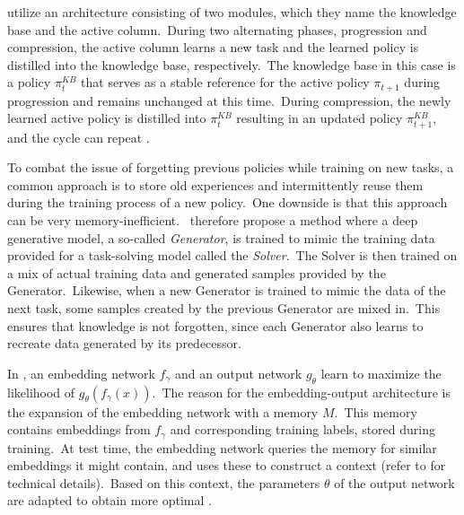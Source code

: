 \textcite{Schwarz2018} utilize an architecture consisting of two modules, which they name the knowledge base and the active column.\ During two alternating phases, progression and compression, the active column learns a new task and the learned policy is distilled into the knowledge base, respectively.\ The knowledge base in this case is a policy $\pi_{t}^{KB}$ that serves as a stable reference for the active policy $\pi_{t+1}$ during progression and remains unchanged at this time.\ During compression, the newly learned active policy is distilled into $\pi_{t}^{KB}$ resulting in an updated policy $\pi_{t+1}^{KB}$, and the cycle can repeat .

To combat the issue of forgetting previous policies while training on new tasks, a common approach is to store old experiences and intermittently reuse them during the training process of a new policy.\ One downside is that this approach can be very memory-inefficient.\ \textcite{Shin2017} therefore propose a method where a deep generative model, a so-called \emph{Generator}, is trained to mimic the training data provided for a task-solving model called the \emph{Solver}.\ The Solver is then trained on a mix of actual training data and generated samples provided by the Generator.\ Likewise, when a new Generator is trained to mimic the data of the next task, some samples created by the previous Generator are mixed in.\ This ensures that knowledge is not forgotten, since each Generator also learns to recreate data generated by its predecessor.

In \textcite{Sprechmann2018}, an embedding network $f_{\gamma}$ and an output network $g_{\theta}$ learn to maximize the likelihood of $g_{\theta}(f_{\gamma}(x))$.\ The reason for the embedding-output architecture is the expansion of the embedding network with a memory $M$.\ This memory contains embeddings from $f_\gamma$ and corresponding training labels, stored during training.\ At test time, the embedding network queries the memory for similar embeddings it might contain, and uses these to construct a context (refer to  for technical details).\ Based on this context, the parameters $\theta$ of the output network are adapted to obtain  more optimal .


